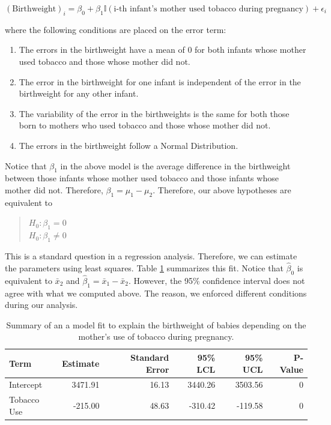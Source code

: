 \documentclass[]{book}
\providecommand{\tightlist}{%
  \setlength{\itemsep}{0pt}\setlength{\parskip}{0pt}}
\theoremstyle{definition}
\theoremstyle{definition}
\theoremstyle{definition}
\theoremstyle{remark}
\begin{document}
\[(\text{Birthweight})_i = \beta_0 + \beta_1\mathbb{I}(\text{i-th infant's mother used tobacco during pregnancy}) + \epsilon_i\]

where the following conditions are placed on the error term:

\begin{enumerate}
\def\labelenumi{\arabic{enumi}.}
\tightlist
\item
  The errors in the birthweight have a mean of 0 for both infants whose
  mother used tobacco and those whose mother did not.
\item
  The error in the birthweight for one infant is independent of the
  error in the birthweight for any other infant.
\item
  The variability of the error in the birthweights is the same for both
  those born to mothers who used tobacco and those whose mother did not.
\item
  The errors in the birthweight follow a Normal Distribution.
\end{enumerate}

Notice that \(\beta_1\) in the above model is the average difference in
the birthweight between those infants whose mother used tobacco and
those infants whose mother did not. Therefore,
\(\beta_1 = \mu_1 - \mu_2\). Therefore, our above hypotheses are
equivalent to

\begin{quote}
\(H_0: \beta_1 = 0\)\\
\(H_0: \beta_1 \neq 0\)
\end{quote}

This is a standard question in a regression analysis. Therefore, we can
estimate the parameters using least squares. Table
\ref{tab:twomeans-fit} summarizes this fit. Notice that
\(\widehat{\beta}_0\) is equivalent to \(\bar{x}_2\) and
\(\widehat{\beta}_1 = \bar{x}_1 - \bar{x}_2\). However, the 95\%
confidence interval does not agree with what we computed above. The
reason, we enforced different conditions during our analysis.

\begin{table}

\caption{\label{tab:twomeans-fit}Summary of an a model fit to explain the birthweight of babies depending on the mother's use of tobacco during pregnancy.}
\centering
\begin{tabular}[t]{l|r|r|r|r|r}
\hline
Term & Estimate & Standard Error & 95\% LCL & 95\% UCL & P-Value\\
\hline
Intercept & 3471.91 & 16.13 & 3440.26 & 3503.56 & 0\\
\hline
Tobacco Use & -215.00 & 48.63 & -310.42 & -119.58 & 0\\
\hline
\end{tabular}
\end{table}
\end{document}
